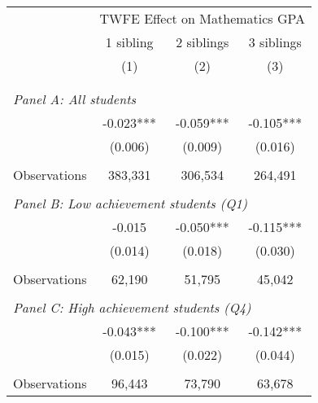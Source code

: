 \makeatletter
{}
{
\makeatother
\begin{tabular}{lccc}
\toprule
\cmidrule(lr){2-4}
& \multicolumn{3}{c}{TWFE Effect on Mathematics GPA} \\
\cmidrule(lr){2-4}
& 1 sibling & 2 siblings & 3 siblings  \\
\cmidrule(lr){2-2} \cmidrule(lr){3-3} \cmidrule(lr){4-4}
& (1) & (2) & (3)\\
\bottomrule
&  &  &  \\
&  &  &   \\
\multicolumn{4}{l}{\textit{Panel A: All students}} \\
\hspace{3mm}        &      -0.023***&      -0.059***&      -0.105***\\
                    &     (0.006)   &     (0.009)   &     (0.016)   \\
                    &               &               &               \\
\hspace{3mm}Observations&     383,331   &     306,534   &     264,491   \\
 
&  &  &   \\
\multicolumn{4}{l}{\textit{Panel B: Low achievement students (Q1)}} \\
\hspace{3mm}        &      -0.015   &      -0.050***&      -0.115***\\
                    &     (0.014)   &     (0.018)   &     (0.030)   \\
                    &               &               &               \\
\hspace{3mm}Observations&      62,190   &      51,795   &      45,042   \\
 
&  &  &   \\
\multicolumn{4}{l}{\textit{Panel C: High achievement students (Q4)}} \\
\hspace{3mm}        &      -0.043***&      -0.100***&      -0.142***\\
                    &     (0.015)   &     (0.022)   &     (0.044)   \\
                    &               &               &               \\
\hspace{3mm}Observations&      96,443   &      73,790   &      63,678   \\
 

\end{tabular}}
